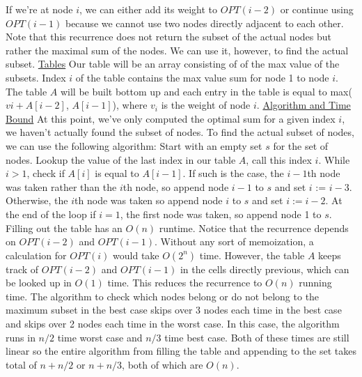 \documentclass[11pt]{article}
\begin{document}
\begin{flushleft}
		If we're at node $i$, we can either add its weight to $OPT(i - 2)$ or continue using $OPT(i - 1)$ because we cannot use two nodes directly adjacent to each other. 
		Note that this recurrence does not return the subset of the actual nodes but rather the maximal sum of the nodes. We can use it, however, to find the actual subset. 
		\newline\newline
		\underline{Tables} \newline
		Our table will be an array consisting of of the max value of the subsets. Index $i$ of the table contains the max value sum for node 1 to node $i$. The table $A$ will be built bottom up and each entry in the table is equal to max($vi + A[i - 2]$, $A[i - 1]$), where $v_i$ is the weight of node $i$. 
		\underline{Algorithm and Time Bound} \newline
		At this point, we've only computed the optimal sum for a given index $i$, we haven't actually found the subset of nodes. To find the actual subset of nodes, we can use the following algorithm: 
		\newline
		Start with an empty set $s$ for the set of nodes. Lookup the value of the last index in our table $A$, call this index $i$. While $i > 1$, check if $A[i]$ is equal to $A[i - 1]$. If such is the case, the $i - 1$th node was taken rather than the $i$th node, so append node $i - 1$ to $s$ and set $i$ := $i - 3$. Otherwise, the $i$th node was taken so append node $i$ to $s$ and set $i := i - 2$. At the end of the loop if $i = 1$, the first node was taken, so append node 1 to $s$. 
		\newline\newline
		Filling out the table has an $O(n)$ runtime. Notice that the recurrence depends on $OPT(i - 2)$ and $OPT(i - 1)$. Without any sort of memoization, a calculation for $OPT(i)$ would take $O(2^n)$ time. However, the table $A$ keeps track of $OPT(i - 2)$ and $OPT(i - 1)$ in the cells directly previous, which can be looked up in $O(1)$ time. This reduces the recurrence to $O(n)$ running time. The algorithm to check which nodes belong or do not belong to the maximum subset in the best case skips over 3 nodes each time in the best case and skips over 2 nodes each time in the worst case. In this case, the algorithm runs in $n/2$ time worst case and $n/3$ time best case. Both of these times are still linear so the entire algorithm from filling the table and appending to the set takes total of $n + n/2$ or $n + n/3$, both of which are $O(n)$. 
		\newline\newline

\end{flushleft}
\end{document}
